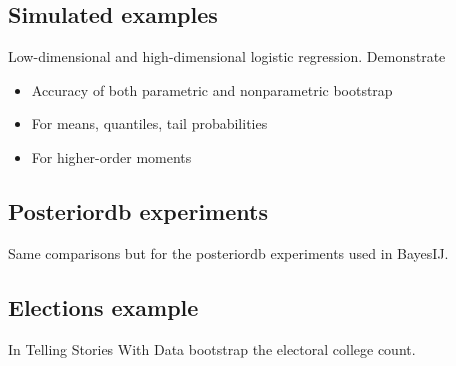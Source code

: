 \subsection{Simulated examples}

Low-dimensional and high-dimensional logistic regression.  Demonstrate
%
\begin{itemize}
\item Accuracy of both parametric and nonparametric bootstrap
\item For means, quantiles, tail probabilities
\item For higher-order moments
\end{itemize}



\subsection{Posteriordb experiments}

Same comparisons but for the posteriordb experiments used in BayesIJ.




\subsection{Elections example}

In Telling Stories With Data bootstrap the electoral college count.